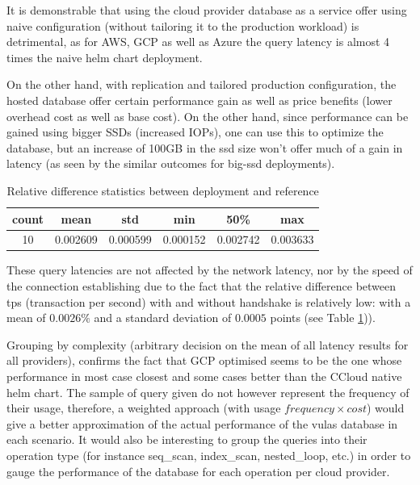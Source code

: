\documentclass[11pt]{article}
\begin{document}
It is demonstrable that using the cloud provider database as a service offer using naive configuration (without tailoring it to the production workload) is detrimental, as for AWS, GCP as well as Azure the query latency is almost 4 times the naive helm chart deployment.


On the other hand, with replication and tailored production configuration, the hosted database offer certain performance gain as well as price benefits (lower overhead cost as well as base cost). On the other hand, since performance can be gained using bigger SSDs (increased IOPs), one can use this to optimize the database, but an increase of 100GB in the ssd size won't offer much of a gain in latency (as seen by the similar outcomes for big-ssd deployments). 

\begin{table}[h]
\centering
\begin{tabular}{|c|c|c|c|c|c|}
\hline
\textbf{count} & \textbf{mean} & \textbf{std} & \textbf{min} & \textbf{50\%} & \textbf{max} \\ \hline
10             & 0.002609      & 0.000599     & 0.000152     & 0.002742      & 0.003633     \\ \hline
\end{tabular}
\caption{Relative difference statistics between deployment and reference}
\label{tab:diff}
\end{table}

These query latencies are not affected by the network latency, nor by the speed of the connection establishing due to the fact that the relative difference between tps (transaction per second) with and without handshake is relatively low: with a mean of $0.0026\%$ and a standard deviation of $0.0005$ points (see Table \ref{tab:diff})).

Grouping by complexity (arbitrary decision on the mean of all latency results for all providers), confirms the fact that GCP optimised seems to be the one whose performance in most case closest and some cases better than the CCloud native helm chart. The sample of query given do not however represent the frequency of their usage, therefore, a weighted approach (with usage $frequency \times cost$) would give a better approximation of the actual performance of the vulas database in each scenario. It would also be interesting to group the queries into their operation type (for instance seq\_scan, index\_scan, nested\_loop, etc.) in order to gauge the performance of the database for each operation per cloud provider.
\end{document}
